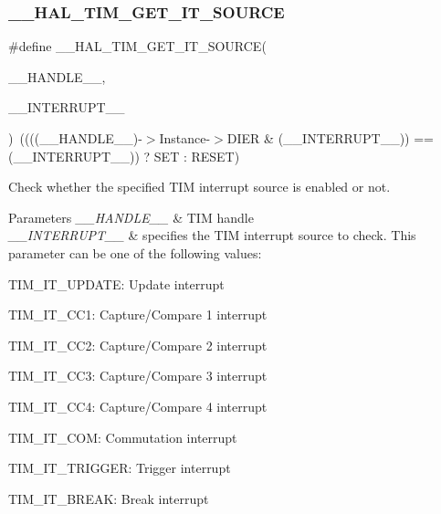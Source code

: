\subsubsection{\texorpdfstring{\+\_\+\+\_\+\+H\+A\+L\+\_\+\+T\+I\+M\+\_\+\+G\+E\+T\+\_\+\+I\+T\+\_\+\+S\+O\+U\+R\+CE}{\_\_HAL\_TIM\_GET\_IT\_SOURCE}}
{\footnotesize\ttfamily \#define \+\_\+\+\_\+\+H\+A\+L\+\_\+\+T\+I\+M\+\_\+\+G\+E\+T\+\_\+\+I\+T\+\_\+\+S\+O\+U\+R\+CE(\begin{DoxyParamCaption}\item[{}]{\+\_\+\+\_\+\+H\+A\+N\+D\+L\+E\+\_\+\+\_\+,  }\item[{}]{\+\_\+\+\_\+\+I\+N\+T\+E\+R\+R\+U\+P\+T\+\_\+\+\_\+ }\end{DoxyParamCaption})~((((\+\_\+\+\_\+\+H\+A\+N\+D\+L\+E\+\_\+\+\_\+)-\/$>$Instance-\/$>$D\+I\+ER \& (\+\_\+\+\_\+\+I\+N\+T\+E\+R\+R\+U\+P\+T\+\_\+\+\_\+)) == (\+\_\+\+\_\+\+I\+N\+T\+E\+R\+R\+U\+P\+T\+\_\+\+\_\+)) ? S\+ET \+: R\+E\+S\+ET)}



Check whether the specified T\+IM interrupt source is enabled or not. 


\begin{DoxyParams}{Parameters}
{\em \+\_\+\+\_\+\+H\+A\+N\+D\+L\+E\+\_\+\+\_\+} & T\+IM handle \\
\hline
{\em \+\_\+\+\_\+\+I\+N\+T\+E\+R\+R\+U\+P\+T\+\_\+\+\_\+} & specifies the T\+IM interrupt source to check. This parameter can be one of the following values\+: \begin{DoxyItemize}
\item T\+I\+M\+\_\+\+I\+T\+\_\+\+U\+P\+D\+A\+TE\+: Update interrupt \item T\+I\+M\+\_\+\+I\+T\+\_\+\+C\+C1\+: Capture/\+Compare 1 interrupt \item T\+I\+M\+\_\+\+I\+T\+\_\+\+C\+C2\+: Capture/\+Compare 2 interrupt \item T\+I\+M\+\_\+\+I\+T\+\_\+\+C\+C3\+: Capture/\+Compare 3 interrupt \item T\+I\+M\+\_\+\+I\+T\+\_\+\+C\+C4\+: Capture/\+Compare 4 interrupt \item T\+I\+M\+\_\+\+I\+T\+\_\+\+C\+OM\+: Commutation interrupt \item T\+I\+M\+\_\+\+I\+T\+\_\+\+T\+R\+I\+G\+G\+ER\+: Trigger interrupt \item T\+I\+M\+\_\+\+I\+T\+\_\+\+B\+R\+E\+AK\+: Break interrupt \end{DoxyItemize}
\\
\hline
\end{DoxyParams}


